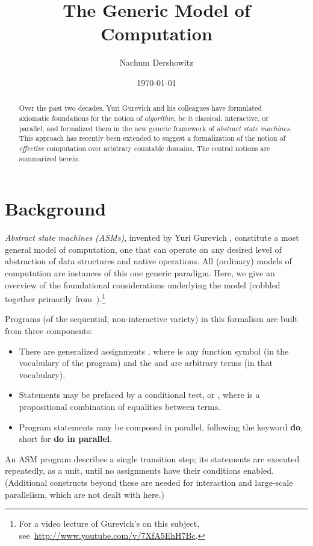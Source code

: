 \documentclass[copyright,creativecommons,english]{eptcs}
\title{The Generic Model of Computation}
\author{Nachum Dershowitz
\institute{School of Computer Science\\Tel Aviv University\\Tel Aviv, Israel}
\email{\url{nachum.dershowitz@cs.tau.ac.il}}}
\date{\today}
\begin{document}
\maketitle

\begin{abstract}
Over the past two decades, Yuri Gurevich and his colleagues have formulated axiomatic foundations for the notion of \emph{algorithm}, be it
classical, interactive, or parallel, and formalized them in the new generic framework of \emph{abstract state machines}. 
This approach has recently been
extended to suggest a formalization of the notion of \emph{effective} computation over arbitrary countable domains.
The central notions are summarized herein.
\end{abstract}

\section{Background}

\textit{Abstract state machines (ASMs)}, invented by Yuri Gurevich
\cite{Gurevich94b}, constitute a most general model of computation,
one that can operate on any desired level of abstraction of data structures and native operations.
All (ordinary) models of computation are instances of this one generic paradigm.
Here, we give an overview of the foundational considerations underlying the model
(cobbled together primarily from~\cite{CT,Exact,Three}).\footnote{For a video lecture of Gurevich's on this subject, see~\url{http://www.youtube.com/v/7XfA5EhH7Bc}.}

Programs (of the sequential, non-interactive variety) in this formalism are built from three components:
\begin{itemize}
\item There are generalized assignments
,
where  is any function symbol  (in the vocabulary of the program)
and
the  and  are arbitrary terms (in that vocabulary).
\item
Statements may be prefaced by a conditional test,
 or ,
where  is a propositional combination of equalities between terms.
\item Program statements may be composed in parallel, following the keyword
\textbf{do}, short for \textbf{do in parallel}.
\end{itemize}
An ASM program describes a single transition step; its statements are executed repeatedly, as a unit, until no assignments have their conditions enabled.
(Additional constructs beyond these are needed for interaction and large-scale parallelism,
which are not dealt with here.)
\end{document}
